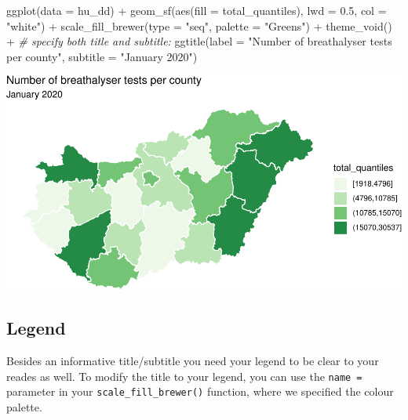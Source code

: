 \documentclass[
]{book}
\makeatletter
\newenvironment{Shaded}{\begin{snugshade}}{\end{snugshade}}
\newcommand{\AttributeTok}[1]{\textcolor[rgb]{0.61,0.61,0.61}{#1}}
\newcommand{\CommentTok}[1]{\textcolor[rgb]{0.37,0.37,0.37}{\textit{#1}}}
\newcommand{\FloatTok}[1]{\textcolor[rgb]{0.06,0.06,0.06}{#1}}
\newcommand{\FunctionTok}[1]{\textcolor[rgb]{0,0,0}{#1}}
\newcommand{\NormalTok}[1]{#1}
\newcommand{\SpecialCharTok}[1]{\textcolor[rgb]{0,0,0}{#1}}
\newcommand{\StringTok}[1]{\textcolor[rgb]{0.5,0.5,0.5}{#1}}
\newenvironment{kframe}{%
\medskip{}
\setlength{\fboxsep}{.8em}
 \def\at@end@of@kframe{}%
 \ifinner\ifhmode%
  \def\at@end@of@kframe{\end{minipage}}%
  \begin{minipage}{\columnwidth}%
 \fi\fi%
 \def\FrameCommand##1{\hskip\@totalleftmargin \hskip-\fboxsep
 \colorbox{shadecolor}{##1}\hskip-\fboxsep
     \hskip-\linewidth \hskip-\@totalleftmargin \hskip\columnwidth}%
 \MakeFramed {\advance\hsize-\width
   \@totalleftmargin\z@ \linewidth\hsize
   \@setminipage}}%
 {\par\unskip\endMakeFramed%
 \at@end@of@kframe}
\renewenvironment{Shaded}{\begin{kframe}}{\end{kframe}}
\makeatother
\begin{document}
\begin{Shaded}
\begin{Highlighting}[]
\FunctionTok{ggplot}\NormalTok{(}\AttributeTok{data =}\NormalTok{ hu\_dd) }\SpecialCharTok{+} 
  \FunctionTok{geom\_sf}\NormalTok{(}\FunctionTok{aes}\NormalTok{(}\AttributeTok{fill =}\NormalTok{ total\_quantiles), }
          \AttributeTok{lwd =} \FloatTok{0.5}\NormalTok{, }\AttributeTok{col =} \StringTok{"white"}\NormalTok{) }\SpecialCharTok{+} 
  \FunctionTok{scale\_fill\_brewer}\NormalTok{(}\AttributeTok{type =} \StringTok{"seq"}\NormalTok{, }\AttributeTok{palette =} \StringTok{"Greens"}\NormalTok{) }\SpecialCharTok{+} 
  \FunctionTok{theme\_void}\NormalTok{() }\SpecialCharTok{+} 
  \CommentTok{\# specify both title and subtitle: }
  \FunctionTok{ggtitle}\NormalTok{(}\AttributeTok{label =} \StringTok{"Number of breathalyser tests per county"}\NormalTok{, }
          \AttributeTok{subtitle =} \StringTok{"January 2020"}\NormalTok{)}
\end{Highlighting}
\end{Shaded}

\includegraphics{crime_mapping_files/figure-latex/titlesubtitle-1.pdf}

\hypertarget{legend}{%
\subsection{Legend}\label{legend}}

Besides an informative title/subtitle you need your legend to be clear to your reades as well. To modify the title to your legend, you can use the \texttt{name\ =} parameter in your \texttt{scale\_fill\_brewer()} function, where we specified the colour palette.
\end{document}
